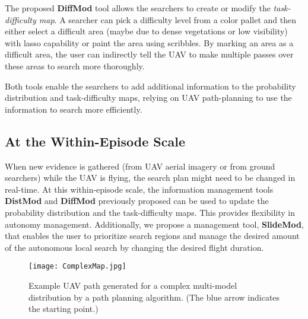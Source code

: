 The proposed \textbf{DiffMod} tool allows the searchers to create or modify the \textit{task-difficulty map}. A searcher can pick a difficulty level from a color pallet and then either select a difficult area (maybe due to dense vegetations or low visibility) with lasso capability or paint the area using scribbles. By marking an area as a difficult area, the user can indirectly tell the UAV to make multiple passes over these areas to search more thoroughly.

Both tools enable the searchers to add additional information to the probability distribution and task-difficulty maps, relying on UAV path-planning to use the information to search more efficiently.

\subsection{At the Within-Episode Scale}

When new evidence is gathered (from UAV aerial imagery or from ground searchers) while the UAV is flying, the search plan might need to be changed in real-time. At this within-episode scale, the information management tools \textbf{DistMod} and \textbf{DiffMod} previously proposed can be used to update the probability distribution and the task-difficulty maps. This provides flexibility in autonomy management. Additionally, we propose a management tool, \textbf{SlideMod}, that enables the user to prioritize search regions and manage the desired amount of the autonomous local search by changing the desired flight duration.

\begin{figure}
\centering
\texttt{[image: ComplexMap.jpg]}
\caption{Example UAV path generated for a complex multi-model distribution by a path planning algorithm. (The blue arrow indicates the starting point.)}
\label{path}
\end{figure}

